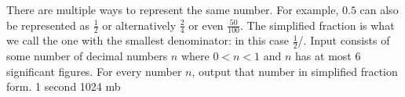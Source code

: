 {There are multiple ways to represent the same number. For example, $0.5$ can also be represented as $\frac{1}{2}$ or alternatively $\frac{2}{4}$ or even $\frac{50}{100}$. The simplified fraction is what we call the one with the smallest denominator: in this case $\frac{1}{2}$/.}
{Input consists of some number of decimal numbers $n$ where $0 < n < 1$ and $n$ has at most 6 significant figures.}
{For every number $n$, output that number in simplified fraction form.}
{1 second}
{1024 mb}
{}